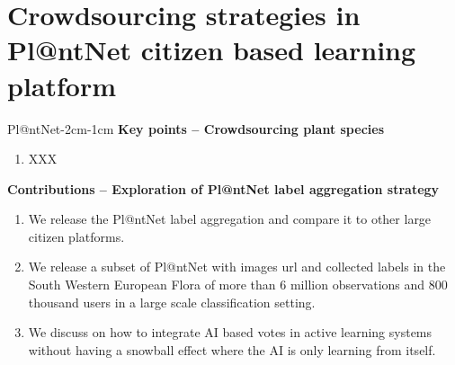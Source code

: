 \chapter{Crowdsourcing strategies in Pl@ntNet citizen based learning platform}
\label{chap:plantnet}
\enlargethispage{3\baselineskip}

\begin{keypointstwomargins}{Pl@ntNet}{-2cm}{-1cm}
        \textbf{Key points -- Crowdsourcing plant species}
        \begin{enumerate}[leftmargin=*]
        \item XXX        
        \end{enumerate}

        \textbf{Contributions -- Exploration of Pl@ntNet label aggregation strategy}
        \begin{enumerate}[leftmargin=*,start=4]
        \item We release the Pl@ntNet label aggregation and compare it to other large citizen platforms.
        \item We release a subset of Pl@ntNet with images url and collected labels in the South Western European Flora of more than $6$ million observations and $800$ thousand users in a large scale classification setting.
        \item We discuss on how to integrate AI based votes in active learning systems without having a snowball effect where the AI is only learning from itself.
        \end{enumerate}
\end{keypointstwomargins}

